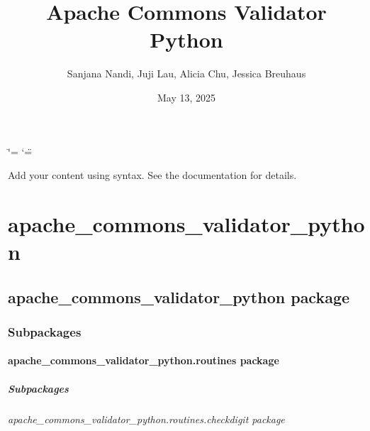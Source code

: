 \documentclass[letterpaper,10pt,english]{sphinxmanual}
\title{Apache Commons Validator Python}
\date{May 13, 2025}
\author{Sanjana Nandi, Juji Lau, Alicia Chu, Jessica Breuhaus}
\begin{document}
\ifdefined\shorthandoff
  \ifnum\catcode`\=\string=\active\shorthandoff{=}\fi
  \ifnum\catcode`\"=\active{}\fi
\fi

\pagestyle{empty}
\sphinxmaketitle
\pagestyle{plain}
\sphinxtableofcontents
\pagestyle{normal}
\label{\detokenize{index::doc}}


\sphinxAtStartPar
Add your content using  syntax. See the
documentation for details.

\sphinxstepscope


\chapter{apache\_commons\_validator\_python}
\label{\detokenize{modules:apache-commons-validator-python}}\label{\detokenize{modules::doc}}
\sphinxstepscope


\section{apache\_commons\_validator\_python package}
\label{\detokenize{apache_commons_validator_python:apache-commons-validator-python-package}}\label{\detokenize{apache_commons_validator_python::doc}}

\subsection{Subpackages}
\label{\detokenize{apache_commons_validator_python:subpackages}}
\sphinxstepscope


\subsubsection{apache\_commons\_validator\_python.routines package}
\label{\detokenize{apache_commons_validator_python.routines:apache-commons-validator-python-routines-package}}\label{\detokenize{apache_commons_validator_python.routines::doc}}

\paragraph{Subpackages}
\label{\detokenize{apache_commons_validator_python.routines:subpackages}}
\sphinxstepscope


\subparagraph{apache\_commons\_validator\_python.routines.checkdigit package}
\label{\detokenize{apache_commons_validator_python.routines.checkdigit:apache-commons-validator-python-routines-checkdigit-package}}\label{\detokenize{apache_commons_validator_python.routines.checkdigit::doc}}
\end{document}
